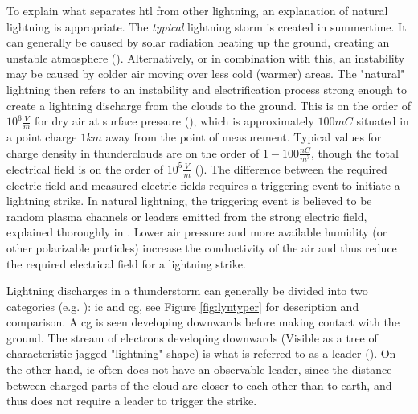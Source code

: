 To explain what separates \acrlong{htl} from other lightning, an explanation of natural lightning is appropriate. The \textit{typical} lightning storm is created in summertime. It can generally be caused by solar radiation heating up the ground, creating an unstable atmosphere (\cite{rakovBok}). Alternatively, or in combination with this, an instability may be caused by colder air moving over less cold (warmer) areas. The "natural" lightning then refers to an instability and electrification process strong enough to create a lightning discharge from the clouds to the ground. This is on the order of $10^6 \frac{V}{m}$ for dry air at  surface pressure (\cite{rakovBok}), which is approximately $100mC$ situated in a point charge $1km$ away from the point of measurement. Typical values for charge density in thunderclouds are on the order of $1-100\frac{nC}{m^3}$, though the total electrical field is on the order of $10^{5} \frac{V}{m}$ (\cite{rakovBok}). The difference between the required electric field and measured electric fields requires a triggering event to initiate a lightning strike. In natural lightning, the triggering event is believed to be random plasma channels or leaders emitted from the strong electric field, explained thoroughly in \cite{rakovBok}. Lower air pressure and more available humidity (or other polarizable particles) increase the conductivity of the air and thus reduce the required electrical field for a lightning strike.

Lightning discharges in a thunderstorm can generally be divided into two categories (e.g. \cite{lynn2011}): \acrfull{ic} and \acrfull{cg}, see Figure \ref{fig:lyntyper} for description and comparison. A \acrshort{cg} is seen developing downwards before making contact with the ground. The stream of electrons developing downwards (Visible as a tree of characteristic jagged "lightning" shape) is what is referred to as a leader (\cite{rakovBok}). On the other hand, \acrshort{ic} often does not have an observable leader, since the distance between charged parts of the cloud are closer to each other than to earth, and thus does not require a leader to trigger the strike.

